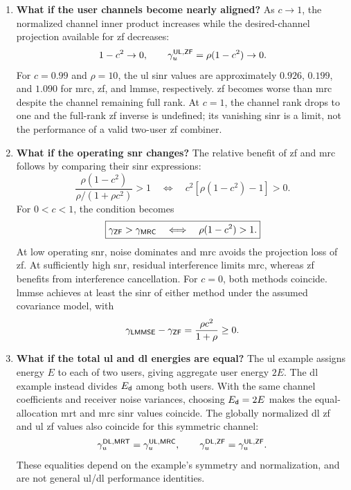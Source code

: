 \begin{enumerate}[label=\textbf{\arabic*.}]
	\item \textbf{What if the user channels become nearly aligned?}
	As $c\to1$, the normalized channel inner product increases while the desired-channel projection available for \ac{zf} decreases:
	\begin{equation*}
		1-c^2\to0,
		\qquad
		\gamma_u^{\mathsf{UL},\mathsf{ZF}}=\rho(1-c^2)\to0.
	\end{equation*}
	For $c=0.99$ and $\rho=10$, the \ac{ul} \ac{sinr} values are approximately $0.926$, $0.199$, and $1.090$ for \ac{mrc}, \ac{zf}, and \ac{lmmse}, respectively. \ac{zf} becomes worse than \ac{mrc} despite the channel remaining full rank. At $c=1$, the channel rank drops to one and the full-rank \ac{zf} inverse is undefined; its vanishing \ac{sinr} is a limit, not the performance of a valid two-user \ac{zf} combiner.
	
	\item \textbf{What if the operating \ac{snr} changes?}
	The relative benefit of \ac{zf} and \ac{mrc} follows by comparing their \ac{sinr} expressions:
	\begin{equation*}
		\frac{\rho(1-c^2)}{\rho/(1+\rho c^2)}>1
		\quad\Longleftrightarrow\quad
		c^2[\rho(1-c^2)-1]>0.
	\end{equation*}
	For $0<c<1$, the condition becomes
	\begin{equation}
		\boxed{
			\gamma_{\mathsf{ZF}}>\gamma_{\mathsf{MRC}}
			\quad\Longleftrightarrow\quad
			\rho(1-c^2)>1.
		}
		\label{eq06:mu-crossover}
	\end{equation}
	At low operating \ac{snr}, noise dominates and \ac{mrc} avoids the projection loss of \ac{zf}. At sufficiently high \ac{snr}, residual interference limits \ac{mrc}, whereas \ac{zf} benefits from interference cancellation. For $c=0$, both methods coincide. \ac{lmmse} achieves at least the \ac{sinr} of either method under the assumed covariance model, with
	\begin{equation*}
		\gamma_{\mathsf{LMMSE}}-\gamma_{\mathsf{ZF}}
		=\frac{\rho c^2}{1+\rho}\geq0.
	\end{equation*}
	
	\item \textbf{What if the total \ac{ul} and \ac{dl} energies are equal?}
	The \ac{ul} example assigns energy $E$ to each of two users, giving aggregate user energy $2E$. The \ac{dl} example instead divides $E_{\mathsf{d}}$ among both users. With the same channel coefficients and receiver noise variances, choosing $E_{\mathsf{d}}=2E$ makes the equal-allocation \ac{mrt} and \ac{mrc} \ac{sinr} values coincide. The globally normalized \ac{dl} \ac{zf} and \ac{ul} \ac{zf} values also coincide for this symmetric channel:
	\begin{equation*}
		\gamma_u^{\mathsf{DL},\mathsf{MRT}}
		=\gamma_u^{\mathsf{UL},\mathsf{MRC}},
		\qquad
		\gamma_u^{\mathsf{DL},\mathsf{ZF}}
		=\gamma_u^{\mathsf{UL},\mathsf{ZF}}.
	\end{equation*}
	These equalities depend on the example's symmetry and normalization, and are not general \ac{ul}/\ac{dl} performance identities.
	

\end{enumerate}
